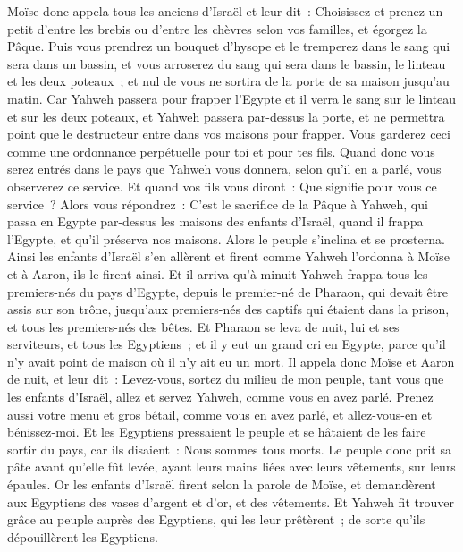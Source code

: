 \begin{multicols}{2}
Moïse donc appela tous les anciens d'Israël et leur dit~: Choisissez et prenez un petit d'entre les brebis ou d'entre les chèvres selon vos familles, et égorgez la Pâque.
Puis vous prendrez un bouquet d'hysope et le tremperez dans le sang qui sera dans un bassin, et vous arroserez du sang qui sera dans le bassin, le linteau et les deux poteaux~; et nul de vous ne sortira de la porte de sa maison jusqu'au matin.
Car Yahweh passera pour frapper l'Egypte et il verra le sang sur le linteau et sur les deux poteaux, et Yahweh passera par-dessus la porte, et ne permettra point que le destructeur entre dans vos maisons pour frapper.
Vous garderez ceci comme une ordonnance perpétuelle pour toi et pour tes fils.
Quand donc vous serez entrés dans le pays que Yahweh vous donnera, selon qu'il en a parlé, vous observerez ce service.
Et quand vos fils vous diront~: Que signifie pour vous ce service~?
Alors vous répondrez~: C'est le sacrifice de la Pâque à Yahweh, qui passa en Egypte par-dessus les maisons des enfants d'Israël, quand il frappa l'Egypte, et qu'il préserva nos maisons. Alors le peuple s'inclina et se prosterna.
Ainsi les enfants d'Israël s'en allèrent et firent comme Yahweh l'ordonna à Moïse et à Aaron, ils le firent ainsi.
Et il arriva qu'à minuit Yahweh frappa tous les premiers-nés du pays d'Egypte, depuis le premier-né de Pharaon, qui devait être assis sur son trône, jusqu'aux premiers-nés des captifs qui étaient dans la prison, et tous les premiers-nés des bêtes.
Et Pharaon se leva de nuit, lui et ses serviteurs, et tous les Egyptiens~; et il y eut un grand cri en Egypte, parce qu'il n'y avait point de maison où il n'y ait eu un mort.
Il appela donc Moïse et Aaron de nuit, et leur dit~: Levez-vous, sortez du milieu de mon peuple, tant vous que les enfants d'Israël, allez et servez Yahweh, comme vous en avez parlé.
Prenez aussi votre menu et gros bétail, comme vous en avez parlé, et allez-vous-en et bénissez-moi.
Et les Egyptiens pressaient le peuple et se hâtaient de les faire sortir du pays, car ils disaient~: Nous sommes tous morts.
Le peuple donc prit sa pâte avant qu'elle fût levée, ayant leurs mains liées avec leurs vêtements, sur leurs épaules.
Or les enfants d'Israël firent selon la parole de Moïse, et demandèrent aux Egyptiens des vases d'argent et d'or, et des vêtements.
Et Yahweh fit trouver grâce au peuple auprès des Egyptiens, qui les leur prêtèrent~; de sorte qu'ils dépouillèrent les Egyptiens.

\end{multicols}
